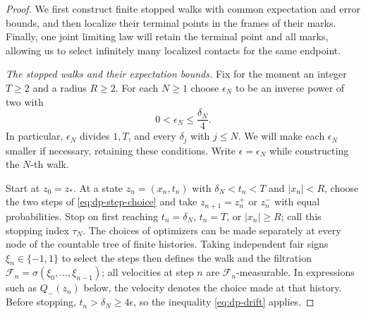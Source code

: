 \begin{proof}
We first construct finite stopped walks with common expectation and error
bounds, and then localize their terminal points in the frames of their
marks.  Finally, one joint limiting law will retain the terminal point and
all marks, allowing us to select infinitely many localized contacts for the
same endpoint.

\medskip\noindent\emph{The stopped walks and their expectation bounds.}
Fix for the moment an integer $T\ge2$ and a radius $R\ge2$.  For each
$N\ge1$ choose $\epsilon_N$ to be an inverse power of two with
\begin{equation}\label{eq:contact-grid}
  0<\epsilon_N\le\frac{\delta_N}{4}.
\end{equation}
In particular, $\epsilon_N$ divides $1,T$, and every $\delta_j$ with
$j\le N$.  We will make each $\epsilon_N$ smaller if necessary, retaining
these conditions.  Write $\epsilon=\epsilon_N$ while constructing the
$N$-th walk.

Start at $z_0=z_*$.  At a state $z_n=(x_n,t_n)$ with
$\delta_N<t_n<T$ and $|x_n|<R$, choose the two steps of
\eqref{eq:dp-step-choice} and take $z_{n+1}=z_n^+$ or $z_n^-$ with equal
probabilities.  Stop on first reaching $t_n=\delta_N$, $t_n=T$, or
$|x_n|\ge R$; call this stopping index $\tau_N$.  The choices of optimizers
can be made separately at every node of the countable tree of finite
histories.  Taking independent fair signs $\xi_n\in\{-1,1\}$ to select the
steps then defines the walk and the filtration
$\mathcal F_n=\sigma(\xi_0,\ldots,\xi_{n-1})$; all velocities at step $n$
are $\mathcal F_n$-measurable.  In expressions such as $Q_-(z_n)$ below,
the velocity denotes the choice made at that history.  Before stopping,
$t_n>\delta_N\ge4\epsilon$, so the inequality \eqref{eq:dp-drift} applies.


\end{proof}
